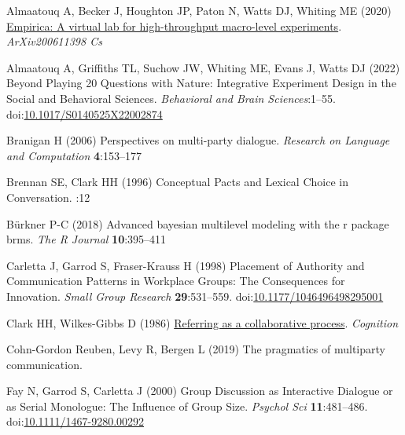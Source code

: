 \documentclass[
  english,
  a4paper,
]{article}
\newlength{\cslhangindent}
\newlength{\cslentryspacingunit} %
\newenvironment{CSLReferences}[2] %
 {%
  \setlength{\parindent}{0pt}
  \ifodd #1
  \let\oldpar\par
  \def\par{\hangindent=\cslhangindent\oldpar}
  \fi
  \setlength{\parskip}{#2\cslentryspacingunit}
 }%
 {}
\begin{document}
\hypertarget{refs}{}
\begin{CSLReferences}{1}{0}
\leavevmode{}%
Almaatouq A, Becker J, Houghton JP, Paton N, Watts DJ, Whiting ME (2020) \href{http://arxiv.org/abs/2006.11398}{Empirica: A virtual lab for high-throughput macro-level experiments}. \emph{ArXiv200611398 Cs}

\leavevmode{}%
Almaatouq A, Griffiths TL, Suchow JW, Whiting ME, Evans J, Watts DJ (2022) Beyond {Playing} 20 {Questions} with {Nature}: {Integrative Experiment Design} in the {Social} and {Behavioral Sciences}. \emph{Behavioral and Brain Sciences}:1--55. doi:\href{https://doi.org/10.1017/S0140525X22002874}{10.1017/S0140525X22002874}

\leavevmode{}%
Branigan H (2006) Perspectives on multi-party dialogue. \emph{Research on Language and Computation} \textbf{4}:153--177

\leavevmode{}%
Brennan SE, Clark HH (1996) Conceptual {Pacts} and {Lexical Choice} in {Conversation}. :12

\leavevmode{}%
Bürkner P-C (2018) Advanced bayesian multilevel modeling with the r package brms. \emph{The R Journal} \textbf{10}:395--411

\leavevmode{}%
Carletta J, Garrod S, Fraser-Krauss H (1998) Placement of {Authority} and {Communication Patterns} in {Workplace Groups}: {The Consequences} for {Innovation}. \emph{Small Group Research} \textbf{29}:531--559. doi:\href{https://doi.org/10.1177/1046496498295001}{10.1177/1046496498295001}

\leavevmode{}%
Clark HH, Wilkes-Gibbs D (1986) \href{http://www.speech.kth.se/~edlund/bielefeld/references/clark-and-wilkes-gibbs-1986.pdf}{Referring as a collaborative process}. \emph{Cognition}

\leavevmode{}%
Cohn-Gordon Reuben, Levy R, Bergen L (2019) The pragmatics of multiparty communication.

\leavevmode{}%
Fay N, Garrod S, Carletta J (2000) Group {Discussion} as {Interactive Dialogue} or as {Serial Monologue}: {The Influence} of {Group Size}. \emph{Psychol Sci} \textbf{11}:481--486. doi:\href{https://doi.org/10.1111/1467-9280.00292}{10.1111/1467-9280.00292}


\end{CSLReferences}
\end{document}
